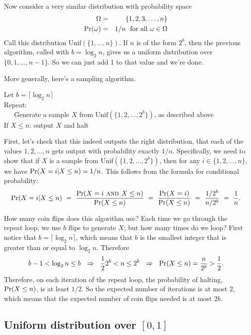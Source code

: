 Now consider a very similar distribution with probability space
\begin{eqnarray*}
\Omega & = & \{1,2,3,\ldots,n\} \\
\mbox{\rm Pr}(\omega) & = & 1/n \mbox{\ \ for all $\omega \in \Omega$}
\end{eqnarray*}
Call this distribution $\mbox{Unif}(\{1,\ldots,n\})$. If $n$ is of the form $2^b$, 
then the previous algorithm, called with $b = \log_2 n$, gives us a uniform distribution
over $\{0,1,\ldots, n-1\}$. So we can just add 1 to that value and we're done.

More generally, here's a sampling algorithm.

\begin{tt}
\begin{tabbing}
Let $b = \lceil \log_2 n \rceil$ \\
Repeat: \\
\ \ \ \= Generate a sample $X$ from $\mbox{Unif}(\{1,2,\ldots, 2^b\})$, as described above \\
      \> If $X \leq n$: output $X$ and halt 
\end{tabbing}
\end{tt}

First, let's check that this indeed outputs the right distribution, that each of the values 
$1,2,\ldots, n$ gets output with probability exactly $1/n$. Specifically, we need to show
that if $X$ is a sample from $\mbox{Unif}(\{1,2,\ldots, 2^b\})$, then for any 
$i \in \{1,2,\ldots, n\}$, we have $\mbox{\rm Pr}(X = i | X \leq n) = 1/n$. This follows from
the formula for conditional probability:
$$
\mbox{\rm Pr}(X = i | X \leq n) 
\ = \ \frac{\mbox{\rm Pr}(X = i \mbox{\sc \ and } X \leq n)}{\mbox{\rm Pr}(X \leq n)}
\ = \ \frac{\mbox{\rm Pr}(X=i)}{\mbox{\rm Pr}(X\leq n)} 
\ = \ \frac{1/2^b}{n/2^b}
\ = \ \frac{1}{n} .$$

How many coin flips does this algorithm use? Each time we go through the repeat loop, we
use $b$ flips to generate $X$; but how many times do we loop? First notice that 
$b = \lceil \log_2 n \rceil$, which means that $b$ is the smallest integer that is
greater than or equal to $\log_2 n$. Therefore
$$ b-1 < \log_2 n \leq b 
\ \ \Rightarrow \ \  \frac{1}{2} 2^b < n \leq 2^b 
\ \ \Rightarrow \ \  \mbox{\rm Pr}(X \leq n) = \frac{n}{2^b} > \frac{1}{2} .
$$
Therefore, on each iteration of the repeat loop, the probability of halting, $\mbox{\rm Pr}(X \leq n)$, 
is at least $1/2$. So the expected number of iterations is at most 2, which means that the 
expected number of coin flips needed is at most $2b$.

\subsection{Uniform distribution over $[0,1]$}

